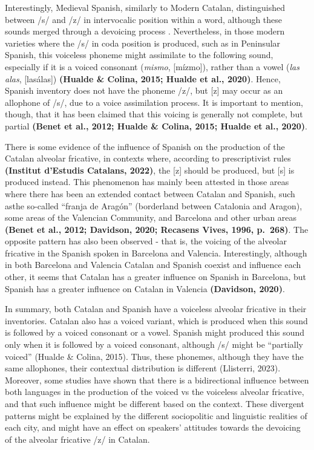 \documentclass[
  a4paper,
  11pt,
  twocolumn]{article}
\begin{document}
Interestingly, Medieval Spanish, similarly to Modern Catalan,
distinguished between /s/ and /z/ in intervocalic position within a
word, although these sounds merged through a devoicing process
\cite{hualde_colina_2015}. Nevertheless, in those modern varieties where
the /s/ in coda position is produced, such as in Peninsular Spanish,
this voiceless phoneme might assimilate to the following sound,
especially if it is a voiced consonant (\emph{mismo}, {[}mízmo{]}),
rather than a vowel (\emph{las alas}, {[}lasálas{]}) \textbf{(Hualde \&
Colina, 2015; Hualde et al., 2020)}. Hence, Spanish inventory does not
have the phoneme /z/, but {[}z{]} may occur as an allophone of /s/, due
to a voice assimilation process. It is important to mention, though,
that it has been claimed that this voicing is generally not complete,
but partial \textbf{(Benet et al., 2012; Hualde \& Colina, 2015; Hualde
et al., 2020)}.

There is some evidence of the influence of Spanish on the production of
the Catalan alveolar fricative, in contexts where, according to
prescriptivist rules \textbf{(Institut d'Estudis Catalans, 2022)}, the
{[}z{]} should be produced, but {[}s{]} is produced instead. This
phenomenon has mainly been attested in those areas where there has been
an extended contact between Catalan and Spanish, such asthe so-called
``franja de Aragón'' (borderland between Catalonia and Aragon), some
areas of the Valencian Community, and Barcelona and other urban areas
\textbf{(Benet et al., 2012; Davidson, 2020; Recasens Vives, 1996,
p.~268)}. The opposite pattern has also been observed - that is, the
voicing of the alveolar fricative in the Spanish spoken in Barcelona and
Valencia. Interestingly, although in both Barcelona and Valencia Catalan
and Spanish coexist and influence each other, it seems that Catalan has
a greater influence on Spanish in Barcelona, but Spanish has a greater
influence on Catalan in Valencia \textbf{(Davidson, 2020)}.

In summary, both Catalan and Spanish have a voiceless alveolar fricative
in their inventories. Catalan also has a voiced variant, which is
produced when this sound is followed by a voiced consonant or a vowel.
Spanish might produced this sound only when it is followed by a voiced
consonant, although /s/ might be ``partially voiced'' (Hualde \& Colina,
2015). Thus, these phonemes, although they have the same allophones,
their contextual distribution is different (Llisterri, 2023). Moreover,
some studies have shown that there is a bidirectional influence between
both languages in the production of the voiced vs the voiceless alveolar
fricative, and that such influence might be different based on the
context. These divergent patterns might be explained by the different
sociopolitic and linguistic realities of each city, and might have an
effect on speakers' attitudes towards the devoicing of the alveolar
fricative /z/ in Catalan.
\end{document}

